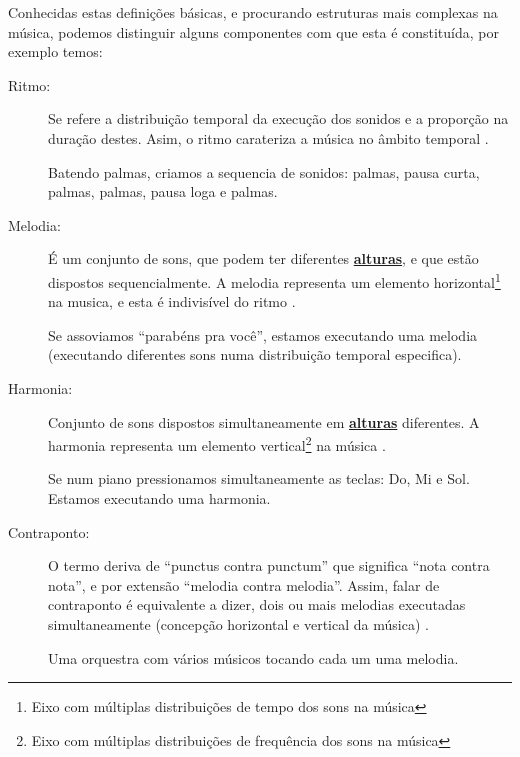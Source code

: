 Conhecidas estas definições básicas, e procurando estruturas mais complexas na música,
podemos distinguir alguns componentes com que esta é constituída, 
por exemplo temos:

\begin{description}
\item [Ritmo:] \label{sec:pos:Ritmo}
Se refere a distribuição temporal da execução dos sonidos e a proporção na duração destes. 
Asim, o ritmo carateriza a música no âmbito temporal \cite[pp. 11]{medteoria}.
\begin{example}
Batendo palmas, criamos a sequencia de sonidos: palmas, pausa curta, palmas, palmas, pausa loga e palmas.
\end{example} 
\item [Melodia:] \label{sec:pos:Melodia}
É um conjunto de sons, que podem ter diferentes \hyperref[sec:pos:Altura]{\textbf{alturas}}, 
e que estão dispostos sequencialmente. 
A melodia representa um elemento horizontal\footnote{\label{eixohor}Eixo com múltiplas distribuições de tempo dos sons na música} na musica, 
e esta é indivisível do ritmo \cite[pp. 517]{apel1969harvard} \cite[pp. 11]{medteoria}.
\begin{example}
Se assoviamos ``parabéns pra você'', estamos executando uma melodia 
(executando diferentes sons numa distribuição temporal especifica).
\end{example} 
\item [Harmonia:] \label{sec:pos:Harmonia}
Conjunto de sons dispostos simultaneamente em \hyperref[sec:pos:Altura]{\textbf{alturas}} diferentes.
A harmonia representa um elemento vertical\footnote{\label{eixover}Eixo com múltiplas distribuições de frequência dos sons na música} na música \cite[pp. 371]{apel1969harvard} \cite[pp. 8]{cardoso1973curso} \cite[pp. 11]{medteoria}. 
\begin{example}
Se num piano pressionamos simultaneamente as teclas: Do, Mi e Sol. Estamos executando uma harmonia.
\end{example} 
\item [Contraponto:] \label{sec:pos:Contraponto}
O termo deriva de ``punctus contra punctum'' que significa ``nota contra nota'', 
e por extensão ``melodia contra melodia''. 
Assim, falar de contraponto é equivalente a dizer, dois ou mais melodias executadas simultaneamente  
(concepção horizontal e vertical da música)  \cite[pp. 208]{apel1969harvard} \cite[pp. 11]{medteoria}.
\begin{example}
Uma orquestra com vários músicos tocando cada um uma melodia.
\end{example} 
\end{description}


